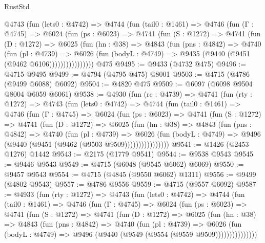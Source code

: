 \begin{lexlean}{RustStd}
\begin{coremodule}
        @4743
          (fun (lets0 : @4742) =>
          @4744
            (fun (tail0 : @1461) =>
            @4746
              (fun (Γ : @4745) =>
              @6024
                (fun (ps : @6023) =>
                @4741
                  (fun (S : @1272) =>
                  @4741
                    (fun (D : @1272) =>
                    @6025
                      (fun (hn : @38) =>
                      @4843
                        (fun (pns : @4842) =>
                        @4740
                          (fun (pl : @4739) =>
                          @6026
                            (fun (bodyL : @4749) => @9435 (@9440 (@9451 (@9462 @6106))))))))))))))))
    @475
@9495 := @9433 (@4732 @475)
@9496 := @4715 @9495
@9499 := @4794 (@4795 @475) @8001
@9503 := @4715 (@4786 (@9499 @6088) @6092)
@9504 := @4820 @475
@9509 := @6097 (@6098 @9504 @8004 @6059 @6061)
@9538 := @4930
    (fun (rc : @4739) =>
    @4741
      (fun (rty : @1272) =>
      @4743
        (fun (lets0 : @4742) =>
        @4744
          (fun (tail0 : @1461) =>
          @4746
            (fun (Γ : @4745) =>
            @6024
              (fun (ps : @6023) =>
              @4741
                (fun (S : @1272) =>
                @4741
                  (fun (D : @1272) =>
                  @6025
                    (fun (hn : @38) =>
                    @4843
                      (fun (pns : @4842) =>
                      @4740
                        (fun (pl : @4739) =>
                        @6026
                          (fun (bodyL : @4749) =>
                          @9496 (@9440 (@9451 (@9462 (@9503 @9509))))))))))))))))
@9541 := @1426 (@2453 @1276) @1442
@9543 := @2175 (@1779 @9541)
@9544 := @9538 @9543
@9545 := @9446 @9543
@9549 := @4715 (@6048 (@9545 @6062) @6069)
@9550 := @9457 @9543
@9554 := @4715 (@4845 (@9550 @6062) @1311)
@9556 := @9499 (@4802 @9543)
@9557 := @4786 @9556
@9559 := @4715 (@9557 @6092)
@9587 := @4933
    (fun (rty : @1272) =>
    @4743
      (fun (lets0 : @4742) =>
      @4744
        (fun (tail0 : @1461) =>
        @4746
          (fun (Γ : @4745) =>
          @6024
            (fun (ps : @6023) =>
            @4741
              (fun (S : @1272) =>
              @4741
                (fun (D : @1272) =>
                @6025
                  (fun (hn : @38) =>
                  @4843
                    (fun (pns : @4842) =>
                    @4740
                      (fun (pl : @4739) =>
                      @6026
                        (fun (bodyL : @4749) =>
                        @9496 (@9440 (@9549 (@9554 (@9559 @9509)))))))))))))))

\end{coremodule}
\end{lexlean}
